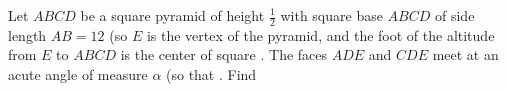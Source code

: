 Let $ABCD$ be a square pyramid of height $\frac{1}{2}$ with square base $ABCD$ of side length $AB=12$ (so $E$ is the vertex of the pyramid, and the foot of the altitude from $E$ to $ABCD$ is the center of square . The faces $ADE$ and $CDE$ meet at an acute angle of measure $\alpha$ (so that . Find 